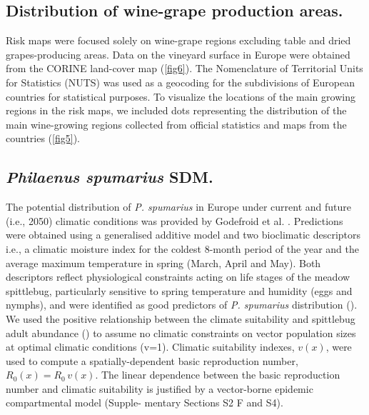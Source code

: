     \subsection{Distribution of wine-grape production areas.} Risk maps were
    focused solely on wine-grape regions excluding table and dried
    grapes-producing
    areas. Data on the vineyard surface in Europe were obtained from the CORINE
    land-cover map \cite{Corine} (\cref{fig6}). The Nomenclature of Territorial
    Units for Statistics (NUTS) was used as a geocoding for the subdivisions of
    European countries for statistical purposes. To visualize the locations of
    the
    main growing regions in the risk maps, we included dots representing the
    distribution of the main wine-growing regions collected from official
    statistics and maps from the countries (\cref{fig5}).

    \subsection{\textit{Philaenus spumarius} SDM.} The potential distribution
    of
    \textit{P. spumarius} in Europe under current and future (i.e., 2050)
    climatic
    conditions was provided by Godefroid et al. \cite{Godefroid2021}.
    Predictions
    were obtained using a generalised additive model and two bioclimatic
    descriptors i.e., a climatic moisture index for the coldest 8-month period
    of
    the year and the average maximum temperature in spring (March, April and
    May).
    Both descriptors reflect physiological constraints acting on life stages of
    the
    meadow spittlebug, particularly sensitive to spring temperature and
    humidity
    (eggs and nymphs), and were identified as good predictors of \textit{P.
        spumarius} distribution (\cite{Godefroid2021}). We used the positive
    relationship between the climate suitability and spittlebug adult abundance
    (\cite{Godefroid2021}) to assume no climatic constraints on vector
    population
    sizes at optimal climatic conditions (v=1). Climatic suitability indexes,
$v(x)$, were used to compute a spatially-dependent basic reproduction number,
$R_0(x)=R_0\, v(x)$. The linear dependence between the basic reproduction
    number and climatic suitability is justified by a vector-borne epidemic
    compartmental model (Supple-
    mentary Sections S2 F and S4).

